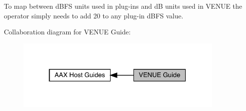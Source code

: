  To map between d\+B\+FS units used in plug-\/ins and dB units used in V\+E\+N\+UE the operator simply needs to add 20 to any plug-\/in d\+B\+FS value.

 Collaboration diagram for V\+E\+N\+UE Guide\+:
\nopagebreak
\begin{figure}[H]
\begin{center}
\leavevmode
\includegraphics[width=290pt]{a00849}
\end{center}
\end{figure}

